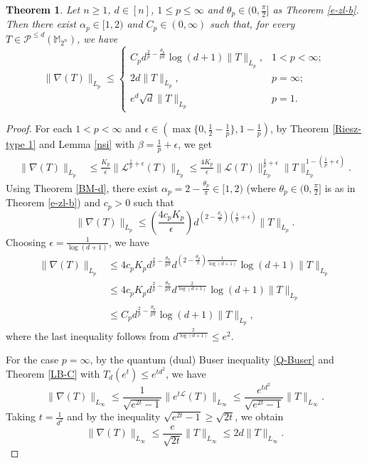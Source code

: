 \documentclass{amsbook}
\newtheorem{theorem}{Theorem}[chapter]
\theoremstyle{definition}
\theoremstyle{remark}
\numberwithin{section}{chapter}
\numberwithin{equation}{chapter}
\newcommand{\1}{\mathbf{1}}
\begin{document}
\begin{theorem}\label{BM-improve-gradient} Let $n\geq1$, $d\in[n]$, $1\leq p\leq\infty$ and $\theta_p\in(0,\frac{\pi}{2}]$ as Theorem \ref{e-zl-b}. Then there exist $\alpha_p \in[1,2)$ and $C_p \in(0, \infty)$ such that, for every  $T\in\mathcal{P}^{\leq d}(\mathbb{M}_{2^n})$, we have
	$$
	\|\nabla (T)\|_{L_{p}} \leq 
	\begin{cases} 
		C_p d^{\frac{2}{p}-\frac{\theta_p}{p\pi}}\log(d+1)\|T\|_{L_{p}}, & 1< p<\infty; \\ 
		2d\|T\|_{L_{p}}, & p=\infty;\\
		e^d\sqrt{d}\|T\|_{L_{p}}& p=1.
	\end{cases}
	$$
\end{theorem}
\begin{proof}  For each $1<p<\infty$ and $\epsilon\in(\max\{0,\frac{1}{2}-\frac{1}{p}\},1-\frac{1}{p})$, 
	by Theorem \ref{Riesz-type 1} and Lemma \ref{nsi} with $\beta=\frac{1}{p}+\epsilon$, we get
	\begin{align*}
		\|\nabla (T)\|_{L_{p}} &\leq \frac{K_p}{\epsilon}\|\mathcal{L}^{\frac{1}{p}+\epsilon}(T)\|_{L_p}\leq \frac{4K_p}{\epsilon}\|\mathcal{L}(T)\|_{L_p}^{\frac{1}{p}+\epsilon}\|T\|_{L_p}^{1-(\frac{1}{p}+\epsilon)}.
	\end{align*}
	Using Theorem \ref{BM-d}, there exist $\alpha_p=2-\frac{\theta_p}{\pi}\in[1,2)$ (where $\theta_p\in(0,\frac{\pi}{2}]$ is as in Theorem \ref{e-zl-b}) and $c_p>0$ such that 
	$$\|\nabla (T)\|_{L_{p}}\leq\left(\frac{4c_pK_p}{\epsilon}\right)d^{(2-\frac{\theta_p}{\pi})(\frac{1}{p}+\epsilon)}\|T\|_{L_{p}}.$$
	Choosing $\epsilon=\frac{1}{\log(d+1)}$, we have
\begin{align*}
\|\nabla (T)\|_{L_{p}}&\leq 4c_pK_pd^{\frac{2}{p}-\frac{\theta_p}{p\pi}}d^{(2-\frac{\theta_p}{\pi})\frac{1}{\log(d+1)}}\log(d+1)\|T\|_{L_{p}}\\
&\leq 4c_pK_pd^{\frac{2}{p}-\frac{\theta_p}{p\pi}}d^{\frac{2}{\log(d+1)}}\log(d+1)\|T\|_{L_{p}}\\
&\leq C_pd^{\frac{2}{p}-\frac{\theta_p}{p\pi}}\log(d+1)\|T\|_{L_{p}},
\end{align*}
where the last inequality follows from $d^{\frac{2}{\log(d+1)}}\leq e^2$.

	For the case $p=\infty$, by the quantum (dual) Buser inequality \eqref{Q-Buser} and Theorem \ref{LB-C} with $T_d(e^t)\leq e^{td^2}$,  we have
	$$\|\nabla (T)\|_{L_{\infty}}\leq \frac{1}{\sqrt{e^{2t}-1}}\|e^{t\mathcal{L}}(T)\|_{L_{\infty}}\leq \frac{e^{td^2}}{\sqrt{e^{2t}-1}}\|T\|_{L_{\infty}}.$$
	Taking $t=\frac{1}{d^{2}}$ and by the inequality $\sqrt{e^{2t}-1}\geq \sqrt{2t}$, we obtain
	$$\|\nabla (T)\|_{L_{\infty}}\leq \frac{e}{\sqrt{2t}}\|T\|_{L_{\infty}}\leq 2d\|T\|_{L_{\infty}}.$$
	

\end{proof}
\end{document}
